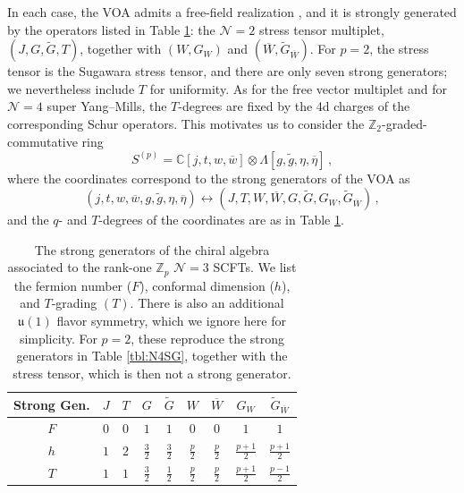 \documentclass[12pt]{article}
\numberwithin{equation}{section}
\numberwithin{figure}{section}
\theoremstyle{plain}
\theoremstyle{definition}
\begin{document}
In each case, the VOA admits a free-field realization \cite{Bonetti:2018fqz}, and it is strongly generated by the operators listed in Table \ref{tbl:N3SG}: the $\mathcal{N}=2$ stress tensor multiplet, $(J, G, \widetilde{G}, T)$, together with $(W, G_W)$ and $(\overline{W}, \widetilde{G}_{\overline{W}})$. For $p = 2$, the stress tensor is the Sugawara stress tensor, and there are only seven strong generators; we nevertheless include $T$ for uniformity. As for the free vector multiplet and for $\mathcal{N}=4$ super Yang--Mills, the $T$-degrees are fixed by the 4d charges of the corresponding Schur operators. This motivates us to consider the $\mathbb{Z}_2$-graded-commutative ring
\begin{equation}\label{eqn:N3S}
    S^{(p)} = \mathbb{C}[j, t, w, \overline{w}] \otimes \Lambda[g, \widetilde{g}, \eta, \overline{\eta}] \,,
\end{equation}
where the coordinates correspond to the strong generators of the VOA as
\begin{equation}
    (j, t, w, \overline{w}, g, \widetilde{g}, \eta, \overline{\eta}) \leftrightarrow (J, T, W, \overline{W}, G,\widetilde{G}, G_W,\widetilde{G}_{\overline{W}}) \,,
\end{equation}
and the $q$- and $T$-degrees of the coordinates are as in Table \ref{tbl:N3SG}.

\begin{table}[H]
    \centering
    \begin{threeparttable}
    \begin{tabular}{ccccccccc}
        \toprule
        Strong Gen. & $J$ & $T$ & $G$ & $\widetilde{G}$ & $W$ & $\overline{W}$ & $G_W$ & $\widetilde{G}_{\overline{W}}$ \\\midrule
        $F$ & $0$ & $0$ & $1$ & $1$ & $0$ & $0$ & $1$ & $1$ \\[1pt]
        $h$ & $1$ & $2$ & $\frac{3}{2}$ & $\frac{3}{2}$ & $\frac{p}{2}$ & $\frac{p}{2}$ & $\frac{p+1}{2}$  & $\frac{p+1}{2}$ \\[3pt]
        $T$ & $1$ & $1$ & $\frac{3}{2}$ & $\frac{1}{2}$ & $\frac{p}{2}$ & $\frac{p}{2}$ & $\frac{p+1}{2}$ & $\frac{p-1}{2}$ \\\bottomrule
    \end{tabular}
    \end{threeparttable}
    \caption{The strong generators of the chiral algebra associated to the rank-one $\mathbb{Z}_p$ $\mathcal{N}=3$ SCFTs. We list the fermion number ($F$), conformal dimension ($h$), and $T$-grading $(T)$. There is also an additional $\mathfrak{u}(1)$ flavor symmetry, which we ignore here for simplicity. For $p = 2$, these reproduce the strong generators in Table \ref{tbl:N4SG}, together with the stress tensor, which is then not a strong generator.}
    \label{tbl:N3SG}
\end{table}
\end{document}
